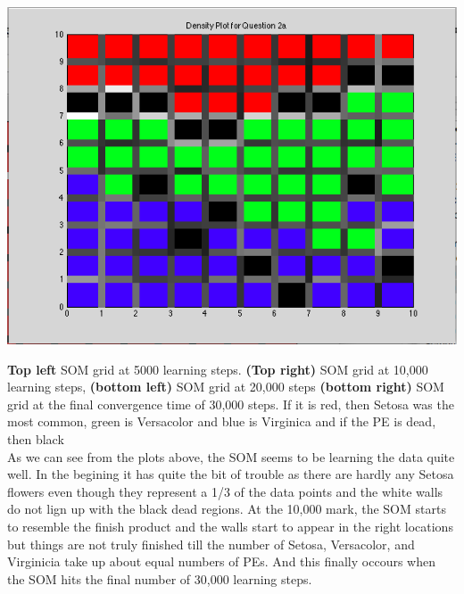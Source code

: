 \documentclass[epsfig]{article}
\begin{document}
\begin{center}
\includegraphics[scale=0.4]{pic61}
\end{center}
\textbf{Top left} SOM grid at 5000 learning steps. \textbf{(Top right)} SOM grid at 10,000 learning steps, \textbf{(bottom left)} SOM grid at 20,000 steps \textbf{(bottom right)} SOM grid at the final convergence time of 30,000 steps. If it is red, then Setosa was the most common, green is Versacolor and blue is Virginica and if the PE is dead, then black\\
\newline
As we can see from the plots above, the SOM seems to be learning the data quite well. In the begining it has quite the bit of trouble as there are hardly any Setosa flowers even though they represent a 1/3 of the data points and the white walls do not lign up with the black dead regions. At the 10,000 mark, the SOM starts to resemble the finish product and the walls start to appear in the right locations but things are not truly finished till the number of Setosa, Versacolor, and Virginicia take up about equal numbers of PEs. And this finally occours when the SOM hits the final number of 30,000 learning steps. 
\end{document}
